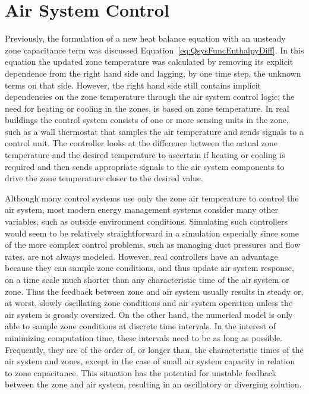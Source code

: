 \section{Air System Control}\label{air-system-control}

Previously, the formulation of a new heat balance equation with an unsteady zone capacitance term was discussed Equation~\ref{eq:QsysFuncEnthalpyDiff}. In this equation the updated zone temperature was calculated by removing its explicit dependence from the right hand side and lagging, by one time step, the unknown terms on that side. However, the right hand side still contains implicit dependencies on the zone temperature through the air system control logic; the need for heating or cooling in the zones, is based on zone temperature. In real buildings the control system consists of one or more sensing units in the zone, such as a wall thermostat that samples the air temperature and sends signals to a control unit. The controller looks at the difference between the actual zone temperature and the desired temperature to ascertain if heating or cooling is required and then sends appropriate signals to the air system components to drive the zone temperature closer to the desired value.

Although many control systems use only the zone air temperature to control the air system, most modern energy management systems consider many other variables, such as outside environment conditions. Simulating such controllers would seem to be relatively straightforward in a simulation especially since some of the more complex control problems, such as managing duct pressures and flow rates, are not always modeled. However, real controllers have an advantage because they can sample zone conditions, and thus update air system response, on a time scale much shorter than any characteristic time of the air system or zone. Thus the feedback between zone and air system usually results in steady or, at worst, slowly oscillating zone conditions and air system operation unless the air system is grossly oversized. On the other hand, the numerical model is only able to sample zone conditions at discrete time intervals. In the interest of minimizing computation time, these intervals need to be as long as possible. Frequently, they are of the order of, or longer than, the characteristic times of the air system and zones, except in the case of small air system capacity in relation to zone capacitance. This situation has the potential for unstable feedback between the zone and air system, resulting in an oscillatory or diverging solution.

